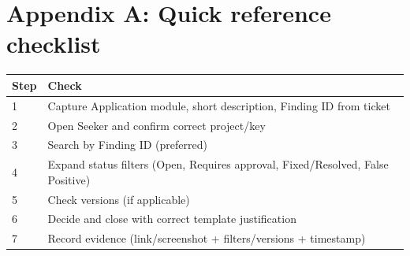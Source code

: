 \documentclass[11pt]{article}
\begin{document}
\section{Appendix A: Quick reference checklist}
\begin{tabularx}{\textwidth}{@{} l X @{}}
\toprule
\textbf{Step} & \textbf{Check} \\
\midrule
1 & Capture Application module, short description, Finding ID from ticket \\
2 & Open Seeker and confirm correct project/key \\
3 & Search by Finding ID (preferred) \\
4 & Expand status filters (Open, Requires approval, Fixed/Resolved, False Positive) \\
5 & Check versions (if applicable) \\
6 & Decide and close with correct template justification \\
7 & Record evidence (link/screenshot + filters/versions + timestamp) \\
\bottomrule
\end{tabularx}
\end{document}
